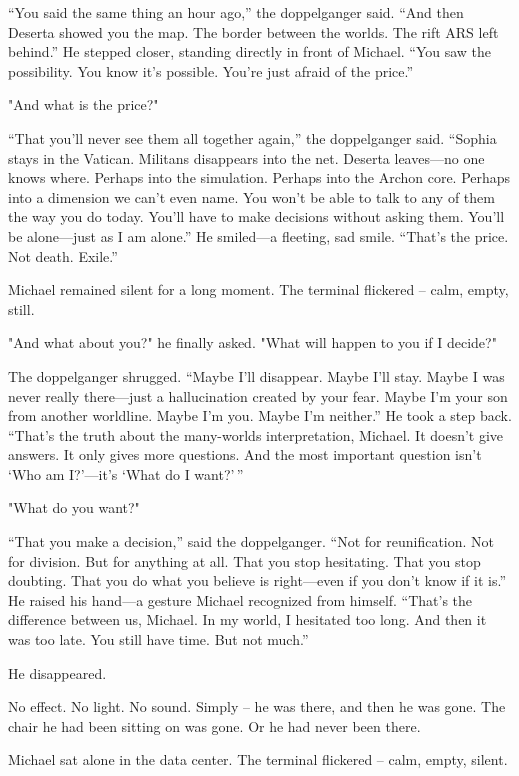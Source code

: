 \documentclass[
]{article}
\begin{document}
``You said the same thing an hour ago,'' the doppelganger said. ``And then Deserta showed you the map. The border between the worlds. The rift ARS left behind.'' He stepped closer, standing directly in front of Michael. ``You saw the possibility. You know it's possible. You're just afraid of the price.''

"And what is the price?"

``That you'll never see them all together again,'' the doppelganger said. ``Sophia stays in the Vatican. Militans disappears into the net. Deserta leaves---no one knows where. Perhaps into the simulation. Perhaps into the Archon core. Perhaps into a dimension we can't even name. You won't be able to talk to any of them the way you do today. You'll have to make decisions without asking them. You'll be alone---just as I am alone.'' He smiled---a fleeting, sad smile. ``That's the price. Not death. Exile.''

Michael remained silent for a long moment. The terminal flickered -- calm, empty, still.

"And what about you?" he finally asked. "What will happen to you if I decide?"

The doppelganger shrugged. ``Maybe I'll disappear. Maybe I'll stay. Maybe I was never really there---just a hallucination created by your fear. Maybe I'm your son from another worldline. Maybe I'm you. Maybe I'm neither.'' He took a step back. ``That's the truth about the many-worlds interpretation, Michael. It doesn't give answers. It only gives more questions. And the most important question isn't `Who am I?'---it's `What do I want?'\,''

"What do you want?"

``That you make a decision,'' said the doppelganger. ``Not for reunification. Not for division. But for anything at all. That you stop hesitating. That you stop doubting. That you do what you believe is right---even if you don't know if it is.'' He raised his hand---a gesture Michael recognized from himself. ``That's the difference between us, Michael. In my world, I hesitated too long. And then it was too late. You still have time. But not much.''

He disappeared.

No effect. No light. No sound. Simply -- he was there, and then he was gone. The chair he had been sitting on was gone. Or he had never been there.

Michael sat alone in the data center. The terminal flickered -- calm, empty, silent.
\end{document}
